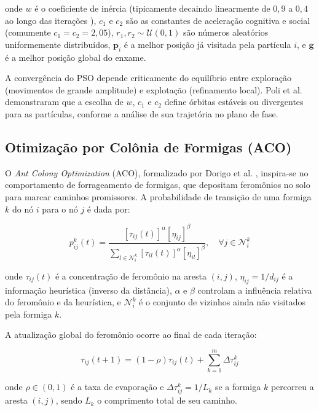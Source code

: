 onde $w$ é o coeficiente de inércia (tipicamente decaindo linearmente de $0{,}9$ a $0{,}4$ ao longo das iterações \cite{zhang2015pso}), $c_1$ e $c_2$ são as constantes de aceleração cognitiva e social (comumente $c_1 = c_2 = 2{,}05$), $r_1, r_2 \sim \mathcal{U}(0,1)$ são números aleatórios uniformemente distribuídos, $\mathbf{p}_i$ é a melhor posição já visitada pela partícula $i$, e $\mathbf{g}$ é a melhor posição global do enxame.

A convergência do PSO depende criticamente do equilíbrio entre exploração (movimentos de grande amplitude) e explotação (refinamento local). Poli et al. \cite{poli2007pso} demonstraram que a escolha de $w$, $c_1$ e $c_2$ define órbitas estáveis ou divergentes para as partículas, conforme a análise de sua trajetória no plano de fase.

\subsection{Otimização por Colônia de Formigas (ACO)}

O \textit{Ant Colony Optimization} (ACO), formalizado por Dorigo et al. \cite{dorigo2006aco}, inspira-se no comportamento de forrageamento de formigas, que depositam feromônios no solo para marcar caminhos promissores. A probabilidade de transição de uma formiga $k$ do nó $i$ para o nó $j$ é dada por:

\begin{equation}
p_{ij}^k(t) = \frac{[\tau_{ij}(t)]^\alpha [\eta_{ij}]^\beta}{\sum_{l \in \mathcal{N}_i^k} [\tau_{il}(t)]^\alpha [\eta_{il}]^\beta}, \quad \forall j \in \mathcal{N}_i^k
\label{eq:aco_transition}
\end{equation}

onde $\tau_{ij}(t)$ é a concentração de feromônio na aresta $(i,j)$, $\eta_{ij} = 1/d_{ij}$ é a informação heurística (inverso da distância), $\alpha$ e $\beta$ controlam a influência relativa do feromônio e da heurística, e $\mathcal{N}_i^k$ é o conjunto de vizinhos ainda não visitados pela formiga $k$.

A atualização global do feromônio ocorre ao final de cada iteração:

\begin{equation}
\tau_{ij}(t+1) = (1 - \rho) \tau_{ij}(t) + \sum_{k=1}^m \Delta \tau_{ij}^k
\label{eq:aco_pheromone}
\end{equation}

onde $\rho \in (0,1)$ é a taxa de evaporação e $\Delta \tau_{ij}^k = 1/L_k$ se a formiga $k$ percorreu a aresta $(i,j)$, sendo $L_k$ o comprimento total de seu caminho.

